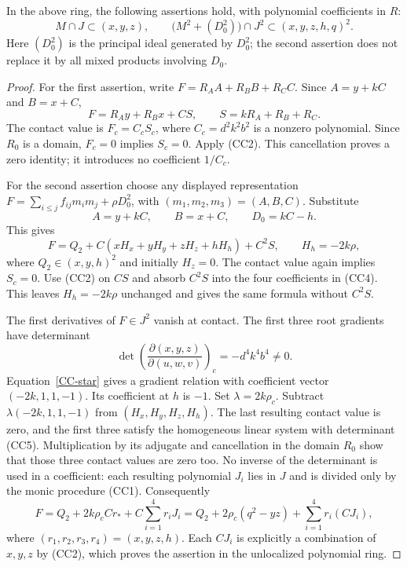 \begin{lemma}
In the above ring, the following assertions hold, with polynomial
coefficients in $R$:
\[
 M\cap J\subset (x,y,z),\qquad
 \bigl(M^2+(D_0^2)\bigr)\cap J^2
       \subset (x,y,z,h,q)^2.                         \tag{CC3}
\]
Here $(D_0^2)$ is the principal ideal generated by $D_0^2$; the second
assertion does not replace it by all mixed products involving $D_0$.
\end{lemma}
\begin{proof}
For the first assertion, write $F=R_AA+R_BB+R_CC$. Since
$A=y+kC$ and $B=x+C$,
\[
 F=R_Ay+R_Bx+CS,\qquad S=kR_A+R_B+R_C.
\]
The contact value is $F_c=C_cS_c$, where $C_c=d^2k^2b^2$ is a nonzero
polynomial. Since $R_0$ is a domain, $F_c=0$ implies $S_c=0$.
Apply (CC2). This cancellation proves a zero identity; it introduces no
coefficient $1/C_c$.

For the second assertion choose any displayed representation
$F=\sum_{i\le j}f_{ij}m_im_j+\rho D_0^2$, with
$(m_1,m_2,m_3)=(A,B,C)$. Substitute
\[
 A=y+kC,\qquad B=x+C,\qquad D_0=kC-h.
\]
This gives
\[
 F=Q_2+C(xH_x+yH_y+zH_z+hH_h)+C^2S,\qquad H_h=-2k\rho,       \tag{CC4}
\]
where $Q_2\in(x,y,h)^2$ and initially $H_z=0$.
The contact value again implies $S_c=0$. Use (CC2) on $CS$ and absorb
$C^2S$ into the four coefficients in (CC4). This leaves $H_h=-2k\rho$
unchanged and gives the same formula without $C^2S$.

The first derivatives of $F\in J^2$ vanish at contact. The first three
root gradients have determinant
\[
 \det\left(\frac{\partial(x,y,z)}{\partial(u,w,v)}\right)_c
       =-d^4k^4b^4\ne0.                              \tag{CC5}
\]
Equation~\eqref{CC-star} gives a gradient relation with coefficient vector
$(-2k,1,1,-1)$. Its coefficient at $h$ is $-1$.
Set $\lambda=2k\rho_c$. Subtract
$\lambda(-2k,1,1,-1)$ from $(H_x,H_y,H_z,H_h)$.
The last resulting contact value is zero, and the first three satisfy the
homogeneous linear system with determinant (CC5). Multiplication by its
adjugate and cancellation in the domain $R_0$ show that those three
contact values are zero too. No inverse of the determinant is used in a
coefficient: each resulting polynomial $J_i$ lies in $J$ and is divided
only by the monic procedure (CC1).
Consequently
\[
 F=Q_2+2k\rho_cCr_*+C\sum_{i=1}^4r_iJ_i
   =Q_2+2\rho_c(q^2-yz)+\sum_{i=1}^4r_i(CJ_i),          \tag{CC6}
\]
where $(r_1,r_2,r_3,r_4)=(x,y,z,h)$. Each $CJ_i$ is explicitly a
combination of $x,y,z$ by (CC2), which proves the assertion in the
unlocalized polynomial ring.
\end{proof}

